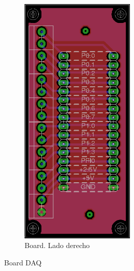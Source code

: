 \begin{figure}[h!]
\begin{subfigure}{0.4\textwidth}
    \includegraphics[width=0.6\textwidth]{images/activities/daq/board-daq-right.png}
    \caption{Board. Lado derecho}
    \label{fig:board-daq-right}
  \end{subfigure}
  \caption{Board DAQ}
  \label{fig:board-daq}
\end{figure}

